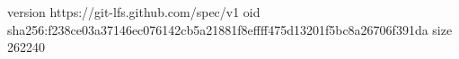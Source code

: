version https://git-lfs.github.com/spec/v1
oid sha256:f238ce03a37146ec076142cb5a21881f8effff475d13201f5bc8a26706f391da
size 262240
